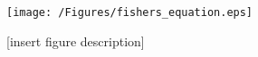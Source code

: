 \documentclass[11pt,a4paper]{article}
\begin{document}
		\begin{figure}[tbh]
			\centering
				\texttt{[image: /Figures/fishers\_equation.eps]}
			\caption{[insert figure description]}
			\label{fig:fishers_equation_sol_pdepe}
		\end{figure}
	



\clearpage
\printbibliography
\end{document}
